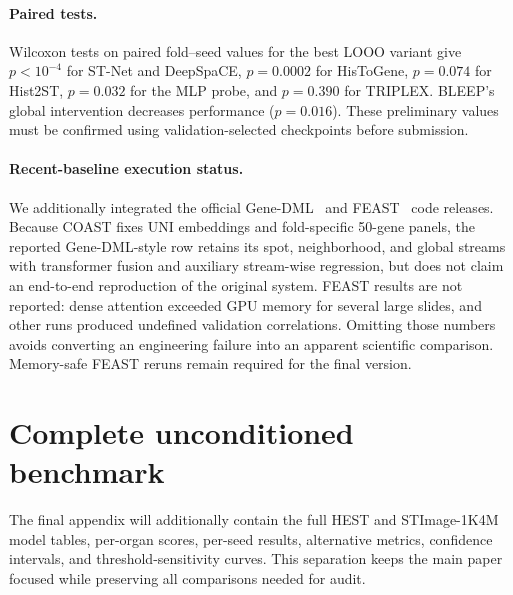 \documentclass[10pt,twocolumn,letterpaper]{article}
\begin{document}
\paragraph{Paired tests.}
Wilcoxon tests on paired fold--seed values for the best LOOO variant give $p<10^{-4}$ for ST-Net and
DeepSpaCE, $p=0.0002$ for HisToGene, $p=0.074$ for Hist2ST, $p=0.032$ for the MLP probe, and
$p=0.390$ for TRIPLEX. BLEEP's global intervention decreases performance ($p=0.016$). These
preliminary values must be confirmed using validation-selected checkpoints before submission.

\paragraph{Recent-baseline execution status.}
We additionally integrated the official Gene-DML~\cite{genedml} and FEAST~\cite{feast} code releases.
Because COAST fixes UNI embeddings and fold-specific 50-gene panels, the reported Gene-DML-style row
retains its spot, neighborhood, and global streams with transformer fusion and auxiliary stream-wise
regression, but does not claim an end-to-end reproduction of the original system. FEAST results are
not reported: dense attention exceeded GPU memory for several large slides, and other runs produced
undefined validation correlations. Omitting those numbers avoids converting an engineering failure
into an apparent scientific comparison. Memory-safe FEAST reruns remain required for the final version.

\section{Complete unconditioned benchmark}
The final appendix will additionally contain the full HEST and STImage-1K4M model tables, per-organ
scores, per-seed results, alternative metrics, confidence intervals, and threshold-sensitivity curves.
This separation keeps the main paper focused while preserving all comparisons needed for audit.

{\footnotesize


}
\end{document}
